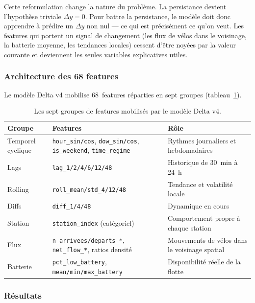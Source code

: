 \documentclass[fleqn, 12pt]{scrartcl}
\begin{document}
\vspace{0.3cm}

Cette reformulation change la nature du problème. La persistance devient l'hypothèse triviale $\Delta y = 0$. Pour battre la persistance, le modèle doit donc apprendre à prédire un $\Delta y$ non nul --- ce qui est précisément ce qu'on veut. Les features qui portent un signal de changement (les flux de vélos dans le voisinage, la batterie moyenne, les tendances locales) cessent d'être noyées par la valeur courante et deviennent les seules variables explicatives utiles.

\subsubsection*{Architecture des 68 features}

Le modèle Delta v4 mobilise 68~features réparties en sept groupes (tableau~\ref{tab:features}).

\begin{table}[htp]
\centering
\small
\begin{tabular}{p{3.2cm}p{6cm}p{5.2cm}}
\hline
\textbf{Groupe} & \textbf{Features} & \textbf{Rôle} \\
\hline
Temporel cyclique & \texttt{hour\_sin/cos}, \texttt{dow\_sin/cos}, \texttt{is\_weekend}, \texttt{time\_regime} & Rythmes journaliers et hebdomadaires \\
\hline
Lags & \texttt{lag\_1/2/4/6/12/48} & Historique de 30~min à 24~h \\
\hline
Rolling & \texttt{roll\_mean/std\_4/12/48} & Tendance et volatilité locale \\
\hline
Diffs & \texttt{diff\_1/4/48} & Dynamique en cours \\
\hline
Station & \texttt{station\_index} (catégoriel) & Comportement propre à chaque station \\
\hline
Flux & \texttt{n\_arrivees/departs\_*}, \texttt{net\_flow\_*}, ratios densité & Mouvements de vélos dans le voisinage spatial \\
\hline
Batterie & \texttt{pct\_low\_battery}, \texttt{mean/min/max\_battery} & Disponibilité réelle de la flotte \\
\hline
\end{tabular}
\caption{Les sept groupes de features mobilisés par le modèle Delta v4.}
\label{tab:features}
\end{table}

\subsubsection*{Résultats}
\end{document}
